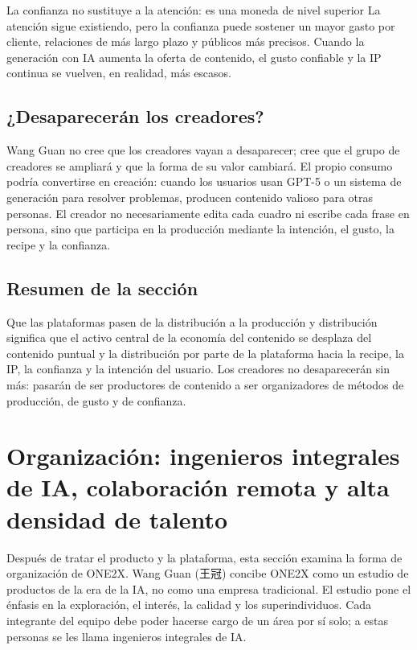 \documentclass[a4paper]{article}
\begin{document}
\begin{warningbox}{La confianza no sustituye a la atención: es una moneda de nivel superior}
La atención sigue existiendo, pero la confianza puede sostener un mayor gasto por cliente, relaciones de más largo plazo y públicos más precisos. Cuando la generación con IA aumenta la oferta de contenido, el gusto confiable y la IP continua se vuelven, en realidad, más escasos.
\end{warningbox}

\subsection{¿Desaparecerán los creadores?}

Wang Guan no cree que los creadores vayan a desaparecer; cree que el grupo de creadores se ampliará y que la forma de su valor cambiará. El propio consumo podría convertirse en creación: cuando los usuarios usan GPT-5 o un sistema de generación para resolver problemas, producen contenido valioso para otras personas. El creador no necesariamente edita cada cuadro ni escribe cada frase en persona, sino que participa en la producción mediante la intención, el gusto, la recipe y la confianza.

\subsection{Resumen de la sección}

Que las plataformas pasen de la distribución a la producción y distribución significa que el activo central de la economía del contenido se desplaza del contenido puntual y la distribución por parte de la plataforma hacia la recipe, la IP, la confianza y la intención del usuario. Los creadores no desaparecerán sin más: pasarán de ser productores de contenido a ser organizadores de métodos de producción, de gusto y de confianza.
\section{Organización: ingenieros integrales de IA, colaboración remota y alta densidad de talento}

Después de tratar el producto y la plataforma, esta sección examina la forma de organización de ONE2X. Wang Guan (王冠) concibe ONE2X como un estudio de productos de la era de la IA, no como una empresa tradicional. El estudio pone el énfasis en la exploración, el interés, la calidad y los superindividuos. Cada integrante del equipo debe poder hacerse cargo de un área por sí solo; a estas personas se les llama ingenieros integrales de IA.
\end{document}
